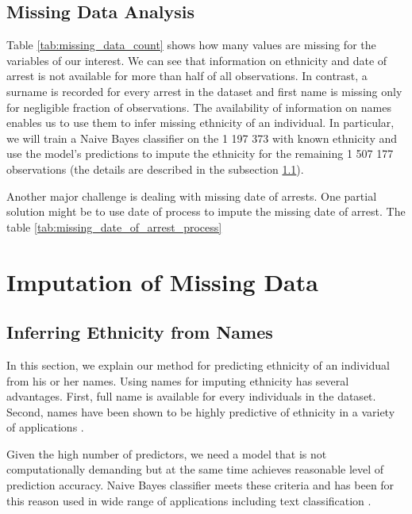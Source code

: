 \subsection{Missing Data Analysis}
Table \ref{tab:missing_data_count} shows how many values are missing for the variables of our interest. We can see that information on ethnicity and date of arrest is not available for more than half of all observations. In contrast, a surname is recorded for every arrest in the dataset and first name is missing only for negligible fraction of observations. The availability of information on names enables us to use them to infer missing ethnicity of an individual. In particular, we will train a Naive Bayes classifier on the 1 197 373 with known ethnicity and use the model's predictions to impute the ethnicity for the remaining 1 507 177 observations (the details are described in the subsection \ref{subsec:inferring_ethnicity}).


Another major challenge is dealing with missing date of arrests. 
One partial solution might be to use date of process to impute the missing date of arrest. The table \ref{tab:missing_date_of_arrest_process}



\newpage
\section{Imputation of Missing Data} \label{sec:missing_data}
\subsection{Inferring Ethnicity from Names} \label{subsec:inferring_ethnicity}
In this section, we explain our method for predicting ethnicity of an individual from his or her names. Using names for imputing ethnicity has several advantages. First, full name  is available for every individuals in the dataset. Second, names have been shown to be highly predictive of ethnicity in a variety of applications \citep{mateos_review_2007, hofstra_sources_2017, hofstra_predicting_2018}. 

Given the high number of predictors, we need a model that is not  computationally demanding but at the same time achieves reasonable level of prediction accuracy. Naive Bayes classifier meets these criteria and has been for this reason used in wide range of applications including text classification  \citep{gentzkow_text_2019}.

